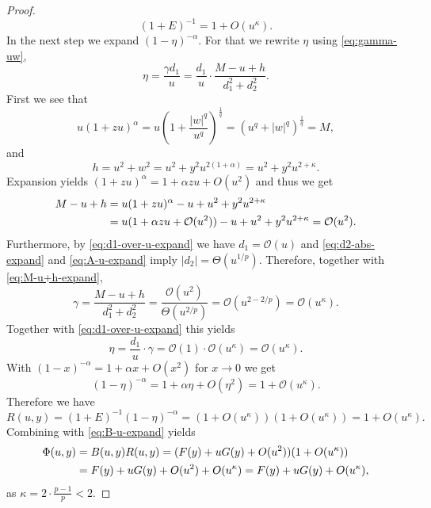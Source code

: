 \documentclass{article}
\begin{document}
\begin{proof}
\begin{equation}
      \label{eq:1+E-inv-expand}
        (1+E)^{-1} = 1 + O(u^\kappa).
    \end{equation}
    In the next step we expand $(1-\eta)^{-\alpha}$.
    For that we rewrite $\eta$ using \eqref{eq:gamma-uw},
    \[
        \eta = \frac{\gamma d_1}{u} = \frac{d_1}{u} \cdot \frac{M - u + h}{d_1^2+d_2^2}.
    \]
    First we see that
    \[
        u(1+zu)^\alpha = u \left( 1 + \frac{|w|^q}{u^q}\right)^{\frac 1q} = (u^q + |w|^q)^{\frac 1q} = M,
    \]
    and
    \[
        h = u^2 + w^2 = u^2 + y^2 u^{2(1+\alpha)} = u^2 + y^2 u^{2+\kappa}.
    \]
    Expansion yields $(1+zu)^\alpha = 1 + \alpha z u + O(u^2)$ and thus we get
    \begin{align}
        \label{eq:M-u+h-expand}
        M-u+h
        &= u(1+zu)^\alpha - u + u^2 + y^2 u^{2+\kappa} \notag\\
        &= u(1+\alpha z u + \mathcal{O}(u^2)) - u + u^2 + y^2 u^{2+\kappa} = \mathcal{O}(u^2).
    \end{align}
    Furthermore, by \eqref{eq:d1-over-u-expand} we have $d_1 = \mathcal{O}(u)$
    and \eqref{eq:d2-abs-expand} and \eqref{eq:A-u-expand} imply $|d_2| = \Theta(u^{1/p})$.
    Therefore, together with \eqref{eq:M-u+h-expand},
    \begin{equation}
        \label{eq:gamma-expand}
        \gamma = \frac{M - u + h}{d_1^2+d_2^2} = \frac{\mathcal{O}(u^2)}{\Theta(u^{2/p})} = \mathcal{O}(u^{2- 2/p}) = \mathcal{O}(u^\kappa).
    \end{equation}
    Together with \eqref{eq:d1-over-u-expand} this yields
    \[
        \eta = \frac{d_1}{u} \cdot \gamma = \mathcal{O}(1) \cdot \mathcal{O}(u^\kappa) = \mathcal{O}(u^\kappa).
    \]
    With $(1-x)^{-\alpha} = 1 + \alpha x + O(x^2)$ for $x \to 0$ we get
    \begin{equation}
      \label{eq:1-eta-alpha-expand}
        (1-\eta)^{-\alpha} = 1 + \alpha \eta + O(\eta^2) = 1 + \mathcal{O}(u^\kappa).
    \end{equation}
    Therefore we have
    \begin{equation}
        \label{eq:R-u-expand}
        R(u,y)= (1+E)^{-1}(1-\eta)^{-\alpha} = (1+O(u^\kappa))(1+O(u^\kappa)) = 1+O(u^\kappa).
    \end{equation}
    Combining with \eqref{eq:B-u-expand} yields
    \begin{align}
        \label{eq:phi-u-expand}
        \Phi(u,y) &= B(u,y)R(u,y) = (F(y) + uG(y) + O(u^2))(1+O(u^\kappa)) \notag\\
        &= F(y) + uG(y) + O(u^2) + O(u^\kappa) = F(y) + uG(y) + O(u^\kappa),
    \end{align}
    as $\kappa = 2\cdot \frac{p-1}{p} < 2$.


\end{proof}
\end{document}

